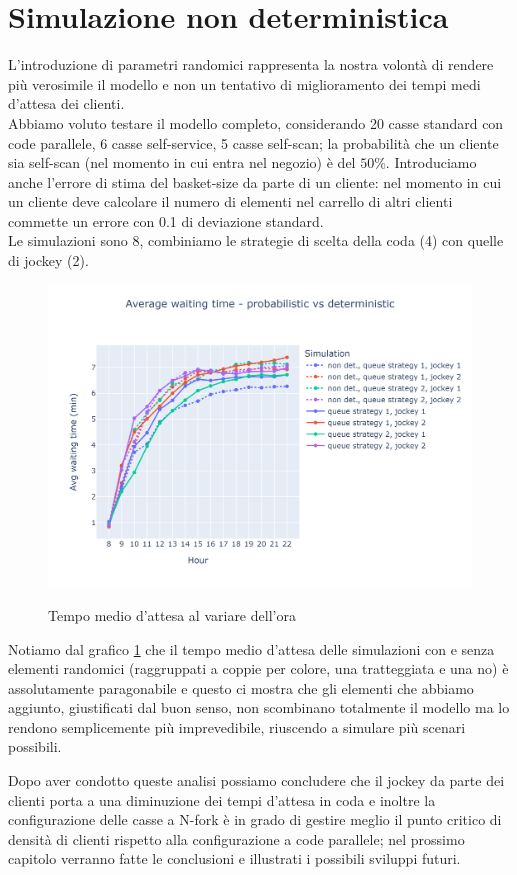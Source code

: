 \section{Simulazione non deterministica}

L'introduzione di parametri randomici rappresenta la nostra volontà di rendere più verosimile il modello e non un tentativo di miglioramento dei tempi medi d'attesa dei clienti. \\
Abbiamo voluto testare il modello completo, considerando 20 casse standard con code parallele, 6 casse self-service, 5 casse self-scan; la probabilità che un cliente sia self-scan (nel momento in cui entra nel negozio) è del $50\%$. Introduciamo anche l'errore di stima del basket-size da parte di un cliente: nel momento in cui un cliente deve calcolare il numero di elementi nel carrello di altri clienti commette un errore con 0.1 di deviazione standard. \\
Le simulazioni sono 8, combiniamo le strategie di scelta della coda (4) con quelle di jockey (2).

\begin{figure}[H]
	\centering
	\includegraphics[width=12cm]{"images/results/avg_wt_prob.png"}
	\label{fig:avg_wt_prob}
	\caption{Tempo medio d'attesa al variare dell'ora}
\end{figure}

Notiamo dal grafico \ref{fig:avg_wt_prob} che il tempo medio d'attesa delle simulazioni con e senza elementi randomici (raggruppati a coppie per colore, una tratteggiata e una no) è assolutamente paragonabile e questo ci mostra che gli elementi che abbiamo aggiunto, giustificati dal buon senso, non scombinano totalmente il modello ma lo rendono semplicemente più imprevedibile, riuscendo a simulare più scenari possibili.

\vspace*{1\baselineskip}

Dopo aver condotto queste analisi possiamo concludere che il jockey da parte dei clienti porta a una diminuzione dei tempi d'attesa in coda e inoltre la configurazione delle casse a N-fork è in grado di gestire meglio il punto critico di densità di clienti rispetto alla configurazione a code parallele; nel prossimo capitolo verranno fatte le conclusioni e illustrati i possibili sviluppi futuri.

